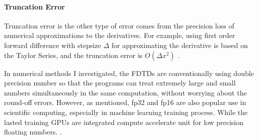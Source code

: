 \paragraph{Truncation Error}
Truncation error is the other type of error comes from the precision loss of numerical approximations to the derivatives.
For example, using first order forward difference with stepsize $\Delta$ for approximating the derivative is based on the Taylor Series, 
and the truncation error is $O(\Delta x^2)$ \cite{GermundNMSCV1P122}.


In numerical methods I investigated, the FDTDs are conventionally using double precision number so that the programs can treat extremely large and small 
numbers simultaneously in the same computation, without worrying about the round-off errors.
However, as mentioned, fp32 and fp16 are also popular use in scientific computing, especially in machine learning training process. 
While the lasted training GPUs are integrated compute accelerate unit for low precision floating numbers. \cite{NVIDIA_HB200_PAPER}.








